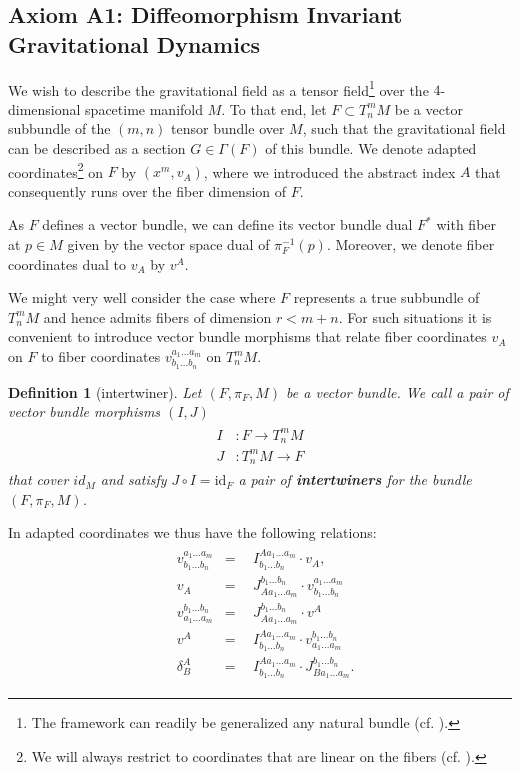 \documentclass[%
preprint,
titlepage,
nofootinbib,
amsmath,amssymb,
showkeys,
aps,
prd,
floatfix,
]{revtex4-2}
\newtheorem{definition}{Definition}
\begin{document}
\subsection{Axiom A1: Diffeomorphism Invariant Gravitational Dynamics }

We wish to describe the gravitational field as a tensor field\footnote{The framework can readily be generalized any natural bundle (cf. \cite{kolar1993natural}).} over the $4$-dimensional spacetime manifold $M$. To that end, let $F \subset T^m_nM$ be a vector subbundle of the $(m,n)$ tensor bundle over $M$, such that the gravitational field can be described as a section $G \in \Gamma(F)$ of this bundle. 
We denote adapted coordinates\footnote{We will always restrict to coordinates that are linear on the fibers (cf. \cite{saunders_1989}).} on $F$ by $(x^m,v_A)$, where we introduced the abstract index $A$ that consequently runs over the fiber dimension of $F$.

As $F$ defines a vector bundle, we can define its vector bundle dual $F^{\ast}$ with fiber at $p\in M$ given by the vector space dual of $\pi_F^{-1}(p)$.
Moreover, we denote fiber coordinates dual to $v_A$ by $v^A$.

We might very well consider the case where $F$ represents a true subbundle of $T^m_nM$ and hence admits fibers of dimension $r < m+n$. For such situations it is convenient to introduce vector bundle morphisms that relate fiber coordinates $v_A$ on $F$ to fiber coordinates $v^{a_1 ... a_m}_{b_1 ... b_n}$ on $T^m_nM$.

\begin{definition}[intertwiner]\label{interDef}
Let $(F,\pi_F,M)$ be a vector bundle. We call a pair of vector bundle morphisms $(I, J)$
\begin{align}
    \begin{aligned}
    I&: F \longrightarrow T^m_n M\\
    J&: T^m_n M \longrightarrow F 
    \end{aligned}
\end{align}
that cover $id_M$ and satisfy
$J \circ I = \mathrm{id}_F$ a pair of \textbf{\textit{intertwiners}} for the bundle $(F, \pi_F, M)$.
\end{definition}
In adapted coordinates we thus have the following relations:
\begin{align} \label{interRel}
    \begin{aligned}
    & v^{a_1 ... a_m}_{b_1 ... b_n} & = & \ \ I^{A a_1 ... a_m}_{b_1 ... b_n} \cdot v_{A},\\  
    & v_A & = & \ \ J^{b_1 ... b_n}_{A a_1 ... a_m} \cdot v^{a_1 ... a_m}_{b_1 ... b_n}\\
    & v^{b_1 ... b_n}_{a_1 ... a_m} & = & \ \ J^{b_1 ... b_n}_{A a_1 ... a_m} \cdot v^{A}\\  
    & v^A & = & \ \  I^{A a_1 ... a_m}_{b_1 ... b_n} \cdot v^{b_1 ... b_n}_{a_1 ... a_m} \\
     &\delta^A _ B &  = & \ \ I^{A a_1 ... a_m}_{b_1 ... b_n} \cdot J^{b_1 ... b_n}_{B a_1 ... a_m}.  
    \end{aligned}
\end{align}
\end{document}
